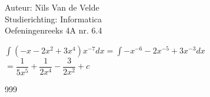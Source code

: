 \documentclass[a4paper]{article}
\begin{document}
  
\noindent \large Auteur: Nils Van de Velde \\
\noindent \large Studierichting: Informatica\\
\noindent \large Oefeningenreeks 4A nr. 6.4\\

\medskip

\normalsize

$\displaystyle\int(-x-2x^2+3x^4)x^{-7}dx=\displaystyle\int-x^{-6}-2x^{-5}+3x^{-3}dx$\\

$=\dfrac{1}{5x^5}+\dfrac{1}{2x^4}-\dfrac{3}{2x^2}+c$\\

\begin{thebibliography}{999}
\end{thebibliography}
\end{document}
